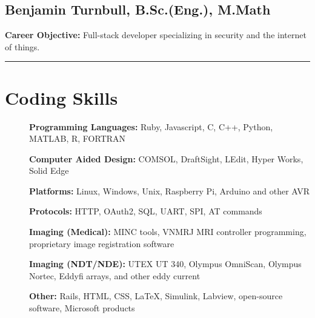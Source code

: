 \documentclass[10pt]{article}
\begin{document}
\begin{center}
\section*{Benjamin Turnbull, B.Sc.(Eng.), M.Math}




\end{center}

\textbf{Career Objective:} Full-stack developer specializing in security and the internet of things.

\vspace{2mm}
\hrule
\vspace{2mm}


\section*{Coding Skills}
\begin{description}

\item[]\textbf{Programming Languages:} Ruby, Javascript, C, C++, Python, MATLAB, R, FORTRAN
\item[]\textbf{Computer Aided Design:} COMSOL, DraftSight, LEdit, Hyper Works, Solid Edge
\item[]\textbf{Platforms:} Linux, Windows, Unix, Raspberry Pi, Arduino and other AVR
\item[]\textbf{Protocols:} HTTP, OAuth2, SQL, UART, SPI, AT commands
\item[]\textbf{Imaging (Medical):} MINC tools, VNMRJ MRI controller programming, proprietary image registration software
\item[]\textbf{Imaging (NDT/NDE):} UTEX UT 340, Olympus OmniScan, Olympus Nortec, Eddyfi arrays, and other eddy current
\item[]\textbf{Other:} Rails, HTML, CSS, \LaTeX{}, Simulink, Labview, open-source software, Microsoft products
\end{description}
\end{document}
